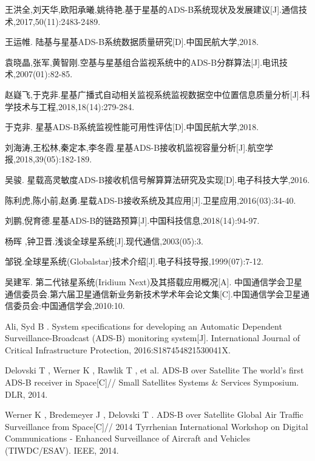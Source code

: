 
\begin{thebibliography}{99}

王洪全,刘天华,欧阳承曦,姚待艳.基于星基的ADS-B系统现状及发展建议[J].通信技术,2017,50(11):2483-2489.

王运帷. 陆基与星基ADS-B系统数据质量研究[D].中国民航大学,2018.

袁晓晶,张军,黄智刚.空基与星基组合监视系统中的ADS-B分群算法[J].电讯技术,2007(01):82-85.

赵嶷飞,于克非.星基广播式自动相关监视系统监视数据空中位置信息质量分析[J].科学技术与工程,2018,18(14):279-284.

于克非. 星基ADS-B系统监视性能可用性评估[D].中国民航大学,2018.

刘海涛,王松林,秦定本,李冬霞.星基ADS-B接收机监视容量分析[J].航空学报,2018,39(05):182-189.

吴骏. 星载高灵敏度ADS-B接收机信号解算算法研究及实现[D].电子科技大学,2016.

陈利虎,陈小前,赵勇.星载ADS-B接收系统及其应用[J].卫星应用,2016(03):34-40.

刘鹏,倪育德.星基ADS-B的链路预算[J].中国科技信息,2018(14):94-97.

杨晖 ,钟卫晋.浅谈全球星系统[J].现代通信,2003(05):3.

邹锐.全球星系统(Globalstar)技术介绍[J].电子科技导报,1999(07):7-12.

吴建军. 第二代铱星系统(Iridium Next)及其搭载应用概况[A]. 中国通信学会卫星通信委员会.第六届卫星通信新业务新技术学术年会论文集[C].中国通信学会卫星通信委员会:中国通信学会,2010:10.


Ali, Syd B . System specifications for developing an Automatic Dependent Surveillance-Broadcast (ADS-B) monitoring system[J]. International Journal of Critical Infrastructure Protection, 2016:S187454821530041X.

Delovski T , Werner K , Rawlik T , et al. ADS-B over Satellite The world’s first ADS-B receiver in Space[C]// Small Satellites Systems \& Services Symposium. DLR, 2014.

Werner K , Bredemeyer J , Delovski T . ADS-B over Satellite Global Air Traffic Surveillance from Space[C]// 2014 Tyrrhenian International Workshop on Digital Communications - Enhanced Surveillance of Aircraft and Vehicles (TIWDC/ESAV). IEEE, 2014.


\end{thebibliography}
